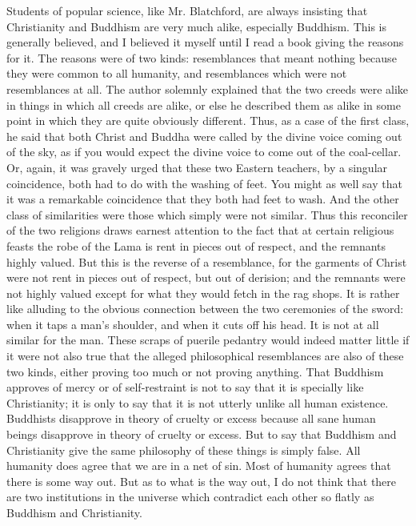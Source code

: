 Students of popular science, like Mr. Blatchford, are always insisting that Christianity and Buddhism are very much alike, especially Buddhism. This is generally believed, and I believed it myself until I read a book giving the reasons for it. The reasons were of two kinds: resemblances that meant nothing because they were common to all humanity, and resemblances which were not resemblances at all. The author solemnly explained that the two creeds were alike in things in which all creeds are alike, or else he described them as alike in some point in which they are quite obviously different. Thus, as a case of the first class, he said that both Christ and Buddha were called by the divine voice coming out of the sky, as if you would expect the divine voice to come out of the coal-cellar. Or, again, it was gravely urged that these two Eastern teachers, by a singular coincidence, both had to do with the washing of feet. You might as well say that it was a remarkable coincidence that they both had feet to wash. And the other class of similarities were those which simply were not similar. Thus this reconciler of the two religions draws earnest attention to the fact that at certain religious feasts the robe of the Lama is rent in pieces out of respect, and the remnants highly valued. But this is the reverse of a resemblance, for the garments of Christ were not rent in pieces out of respect, but out of derision; and the remnants were not highly valued except for what they would fetch in the rag shops. It is rather like alluding to the obvious connection between the two ceremonies of the sword: when it taps a man’s shoulder, and when it cuts off his head. It is not at all similar for the man. These scraps of puerile pedantry would indeed matter little if it were not also true that the alleged philosophical resemblances are also of these two kinds, either proving too much or not proving anything. That Buddhism approves of mercy or of self-restraint is not to say that it is specially like Christianity; it is only to say that it is not utterly unlike all human existence. Buddhists disapprove in theory of cruelty or excess because all sane human beings disapprove in theory of cruelty or excess. But to say that Buddhism and Christianity give the same philosophy of these things is simply false. All humanity does agree that we are in a net of sin. Most of humanity agrees that there is some way out. But as to what is the way out, I do not think that there are two institutions in the universe which contradict each other so flatly as Buddhism and Christianity.

